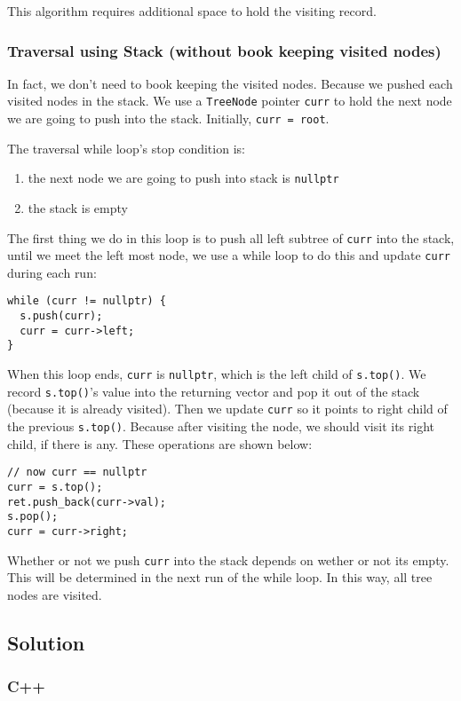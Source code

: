\documentclass[12pt]{article}
\begin{document}
This algorithm requires additional space to hold the visiting record.
\subsubsection{Traversal using Stack (without book keeping visited nodes)}
\label{sec:org18b2c7c}
In fact, we don't need to book keeping the visited nodes. Because we pushed each visited nodes in the stack. We use a \texttt{TreeNode} pointer \texttt{curr} to hold the next node we are going to push into the stack. Initially, \texttt{curr = root}.

The traversal while loop's stop condition is:
\begin{enumerate}
\item the next node we are going to push into stack is \texttt{nullptr}
\item the stack is empty
\end{enumerate}

The first thing we do in this loop is to push all left subtree of \texttt{curr} into the stack, until we meet the left most node, we use a while loop to do this and update \texttt{curr} during each run:
\begin{verbatim}
while (curr != nullptr) {
  s.push(curr);
  curr = curr->left;
}
\end{verbatim}
When this loop ends, \texttt{curr} is \texttt{nullptr}, which is the left child of \texttt{s.top()}. We record \texttt{s.top()}'s value into the returning vector and pop it out of the stack (because it is already visited). Then we update \texttt{curr} so it points to right child of the previous \texttt{s.top()}. Because after visiting the node, we should visit its right child, if there is any. These operations are shown below:
\begin{verbatim}
// now curr == nullptr
curr = s.top();
ret.push_back(curr->val);
s.pop();
curr = curr->right;
\end{verbatim}
Whether or not we push \texttt{curr} into the stack depends on wether or not its empty. This will be determined in the next run of the while loop. In this way, all tree nodes are visited.

\subsection{Solution}
\label{sec:org35dc7b2}
\subsubsection{C++}
\label{sec:orgd39da94}
\end{document}
